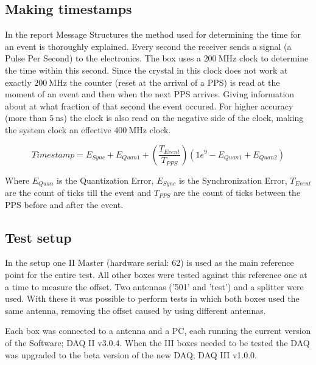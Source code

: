 \subsection{Making timestamps}
\label{sub:gps_timestamps}

In the report Message Structures \hisparc the method used for
determining the time for an event is thoroughly explained. Every second
the \gps receiver sends a signal (a Pulse Per Second) to the \hisparc
electronics. The \hisparc box uses a $\SI{200}{\mega\hertz}$ clock to
determine the time within this second. Since the crystal in this clock
does not work at exactly $\SI{200}{\mega\hertz}$ the counter (reset at
the arrival of a PPS) is read at the moment of an event and then when
the next PPS arrives. Giving information about at what fraction of that
second the event occured. For higher accuracy (more than
$\SI{5}{\nano\second}$) the clock is also read on the negative side of
the clock, making the system clock an effective
$\SI{400}{\mega\hertz}$ clock.

\begin{equation}
    Timestamp = E_{Sync} + E_{Quan1} + \left(\frac{T_{Event}}{T_{PPS}}\right) 
                 \left(1e^9 - E_{Quan1} + E_{Quan2}\right)
\end{equation}

Where $E_{Quan}$ is the Quantization Error, $E_{Sync}$ is the
Synchronization Error, $T_{Event}$ are the count of ticks till the event
and $T_{PPS}$ are the count of ticks between the PPS before and after
the event.



\subsection{Test setup}
\label{sub:gps_test_setup}

In the setup one \hisparc II Master (hardware serial: 62) is used as the
main reference point for the entire test. All other \hisparc boxes were
tested against this reference one at a time to measure the offset. Two
\gps antennas ('501' and 'test') and a \gps splitter were used. With
these it was possible to perform tests in which both \hisparc boxes used
the same \gps antenna, removing the offset caused by using different
\gps antennas.

Each \hisparc box was connected to a \gps antenna and a PC, each running
the current version of the \hisparc Software; \hisparc DAQ II v3.0.4.
When the \hisparc III boxes needed to be tested the DAQ was upgraded to
the beta version of the new DAQ; \hisparc DAQ III v1.0.0.

